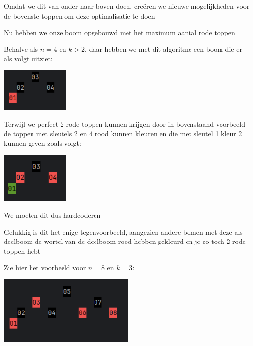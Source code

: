 \documentclass{article}
\begin{document}
Omdat we dit van onder naar boven doen, creëren we nieuwe mogelijkheden voor de bovenste toppen om deze optimalisatie te doen

Nu hebben we onze boom opgebouwd met het maximum aantal rode toppen

\newpage

Behalve als $n = 4$ en $k > 2$, daar hebben we met dit algoritme een boom die er als volgt uitziet:

\vspace{0.2cm}

\includegraphics[width=0.25\textwidth]{foutieve_rebuild_n4.png}

\vspace{0.2cm}

Terwijl we perfect 2 rode toppen kunnen krijgen door in bovenstaand voorbeeld de toppen met sleutels 2 en 4 rood kunnen kleuren en die met sleutel 1 kleur 2 kunnen geven zoals volgt:

\vspace{0.2cm}

\includegraphics[width=0.25\textwidth]{correcte_rebuild_n4.png}

\vspace{0.2cm}

We moeten dit dus hardcoderen

Gelukkig is dit het enige tegenvoorbeeld, aangezien andere bomen met deze als deelboom de wortel van de deelboom rood hebben gekleurd en je zo toch 2 rode toppen hebt

Zie hier het voorbeeld voor $n = 8$ en $k = 3$:

\vspace{0.2cm}

\includegraphics[width=0.5\textwidth]{rainbow_rebuild_n8.png}
\end{document}
